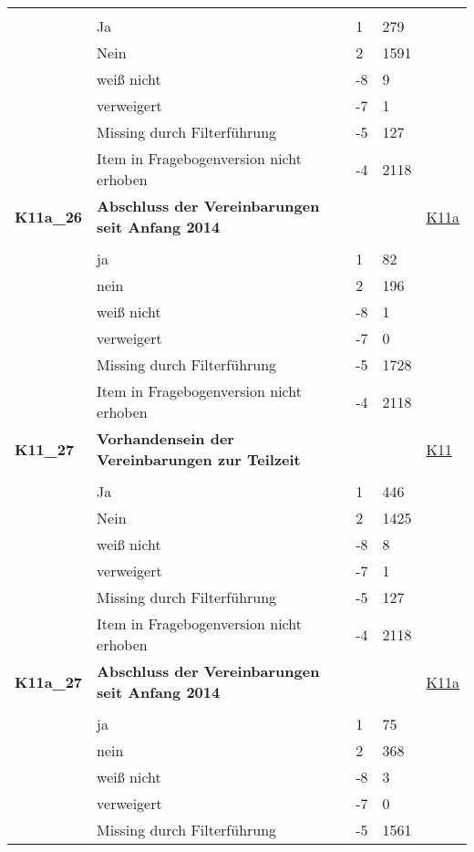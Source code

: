 \begin{longtable}{| L{2.5cm} | L{8.25cm}| C{1.5cm} | R{1.25cm} | C{2.25cm} |  }
   &  &  &  &  \\ 
   & Ja & 1 & 279 &  \\ 
   & Nein & 2 & 1591 &  \\ 
   & weiß nicht & -8 & 9 &  \\ 
   & verweigert & -7 & 1 &  \\ 
   & Missing durch Filterführung & -5 & 127 &  \\ 
   & Item in Fragebogenversion nicht erhoben & -4 & 2118 &  \\ 
   \midrule
\textbf{K11a\_26}\label{var:suf:K11a:26} & \textbf{Abschluss der Vereinbarungen seit Anfang 2014} &  &  & \hyperref[K11a]{K11a} \\ 
   &  &  &  &  \\ 
   & ja & 1 & 82 &  \\ 
   & nein & 2 & 196 &  \\ 
   & weiß nicht & -8 & 1 &  \\ 
   & verweigert & -7 & 0 &  \\ 
   & Missing durch Filterführung & -5 & 1728 &  \\ 
   & Item in Fragebogenversion nicht erhoben & -4 & 2118 &  \\ 
   \midrule
\textbf{K11\_27}\label{var:suf:K11:27} & \textbf{Vorhandensein der Vereinbarungen zur Teilzeit} &  &  & \hyperref[K11]{K11} \\ 
   &  &  &  &  \\ 
   & Ja & 1 & 446 &  \\ 
   & Nein & 2 & 1425 &  \\ 
   & weiß nicht & -8 & 8 &  \\ 
   & verweigert & -7 & 1 &  \\ 
   & Missing durch Filterführung & -5 & 127 &  \\ 
   & Item in Fragebogenversion nicht erhoben & -4 & 2118 &  \\ 
   \midrule
\textbf{K11a\_27}\label{var:suf:K11a:27} & \textbf{Abschluss der Vereinbarungen seit Anfang 2014} &  &  & \hyperref[K11a]{K11a} \\ 
   &  &  &  &  \\ 
   & ja & 1 & 75 &  \\ 
   & nein & 2 & 368 &  \\ 
   & weiß nicht & -8 & 3 &  \\ 
   & verweigert & -7 & 0 &  \\ 
   & Missing durch Filterführung & -5 & 1561 &  \\ 

\end{longtable}
